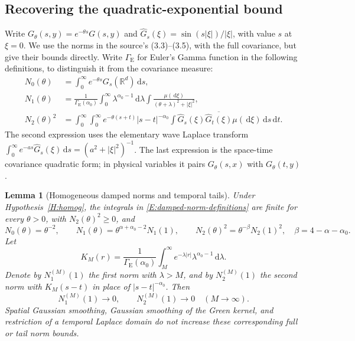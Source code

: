 \documentclass[12pt]{article}
\numberwithin{equation}{section}
\newtheorem{lemma}[theorem]{Lemma}
\theoremstyle{definition}
\newcommand{\R}{\mathbb{R}}
\newcommand{\ud}{\,\mathrm{d}}
\begin{document}
\subsection{Recovering the quadratic-exponential bound}

Write $G_\theta(s,y)=e^{-\theta s}G(s,y)$ and
$\widehat G_s(\xi)=\sin(s|\xi|)/|\xi|$, with value $s$ at $\xi=0$.
We use the norms in the source's (3.3)--(3.5), with the full covariance,
but give their bounds directly. Write $\Gamma_{\mathrm E}$ for Euler's
Gamma function in the following definitions, to distinguish it from the
covariance measure:
\begin{equation}\label{E:damped-norm-definitions}
  \begin{split}
    N_0(\theta)&=\int_0^\infty e^{-\theta s}G_s(\R^d)\ud s,\\
    N_1(\theta)&=\frac1{\Gamma_{\mathrm E}(\alpha_0)}
    \int_0^\infty\lambda^{\alpha_0-1}\ud\lambda
    \int\frac{\mu(\ud\xi)}{(\theta+\lambda)^2+|\xi|^2},\\
    N_2(\theta)^2&=\int_0^\infty\int_0^\infty
    e^{-\theta(s+t)}|s-t|^{-\alpha_0}
    \int\widehat G_s(\xi)\overline{\widehat G_t(\xi)}
    \mu(\ud\xi)\ud s\ud t.
  \end{split}
\end{equation}
The second expression uses the elementary wave Laplace transform
$\int_0^\infty e^{-as}\widehat G_s(\xi)\ud s=(a^2+|\xi|^2)^{-1}$.
The last expression is the space-time covariance quadratic form;
in physical variables it pairs $G_\theta(s,x)$ with $G_\theta(t,y)$.

\begin{lemma}[Homogeneous damped norms and temporal tails]
  \label{L:damped-homogeneous-norms}
  Under Hypothesis~\ref{H:homog}, the integrals in
  \eqref{E:damped-norm-definitions} are finite for every $\theta>0$,
  with $N_2(\theta)^2\ge0$, and
  \[
    N_0(\theta)=\theta^{-2},\qquad
    N_1(\theta)=\theta^{\alpha+\alpha_0-2}N_1(1),\qquad
    N_2(\theta)^2=\theta^{-\beta}N_2(1)^2,
    \quad\beta=4-\alpha-\alpha_0.
  \]
  Let
  \[
    K_M(r)=\frac1{\Gamma_{\mathrm E}(\alpha_0)}
    \int_M^\infty e^{-\lambda|r|}\lambda^{\alpha_0-1}\ud\lambda.
  \]
  Denote by $N_1^{(M)}(1)$ the first norm with $\lambda>M$, and by
  $N_2^{(M)}(1)$ the second norm with $K_M(s-t)$ in place of
  $|s-t|^{-\alpha_0}$. Then
  \begin{equation}\label{E:damped-tail-norms}
    N_1^{(M)}(1)\longrightarrow0,\qquad
    N_2^{(M)}(1)\longrightarrow0\quad(M\to\infty).
  \end{equation}
  Spatial Gaussian smoothing, Gaussian smoothing of the Green kernel,
  and restriction of a temporal Laplace domain do not increase these
  corresponding full or tail norm bounds.
\end{lemma}
\end{document}

